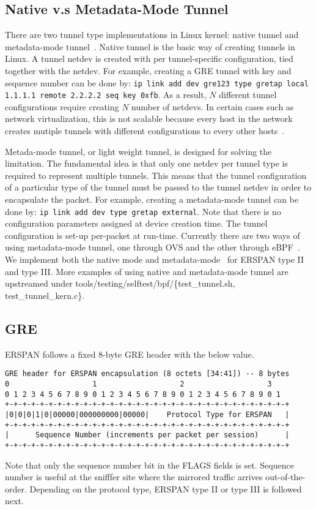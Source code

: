 \documentclass{sigplanconf}
\begin{document}
\subsection{Native v.s Metadata-Mode Tunnel}
There are two tunnel type implementations in Linux kernel:
native tunnel and metadata-mode tunnel~\cite{lwtunnel}.
Native tunnel is the basic way of creating tunnels in Linux.
A tunnel netdev is created with per tunnel-specific configuration,
tied together with the netdev. For example, creating a GRE tunnel
with key and sequence number can be done by:
\texttt{ip link add dev gre123 type gretap local 1.1.1.1 remote 2.2.2.2 seq key 0xfb}.
As a result, $N$ different tunnel configurations require creating
$N$ number of netdevs.  In certain cases such as network virtualization,
this is not scalable because every host in the network creates
mutiple tunnels with different configurations to every other hosts~\cite{nvp}.

Metada-mode tunnel, or light weight tunnel, is designed for solving
the limitation.  The fundamental idea is that only one netdev per
tunnel type is required to represent multiple tunnels.
This means that the tunnel configuration of a particular type
of the tunnel must be passed to the tunnel netdev in order
to encapsulate the packet.  For example, creating a metadata-mode
tunnel can be done by:
\texttt{ip link add dev type gretap external}.
Note that there is no configuration parameters assigned at device creation
time. The tunnel configuration is set-up per-packet at run-time.
Currently there are two ways of using metadata-mode tunnel, one through
OVS and the other through eBPF~\cite{dborkman}.
We implement both the native mode and metadata-mode~\cite{erspanmd}
for ERSPAN type II and type III.
More examples of using native and metadata-mode tunnel are upstreamed
under tools/testing/selftest/bpf/\{test\_tunnel.sh, test\_tunnel\_kern.c\}.

\subsection{GRE}
ERSPAN follows a fixed 8-byte GRE header with the below value.
{\scriptsize
\begin{verbatim}
GRE header for ERSPAN encapsulation (8 octets [34:41]) -- 8 bytes
0                   1                   2                   3
0 1 2 3 4 5 6 7 8 9 0 1 2 3 4 5 6 7 8 9 0 1 2 3 4 5 6 7 8 9 0 1
+-+-+-+-+-+-+-+-+-+-+-+-+-+-+-+-+-+-+-+-+-+-+-+-+-+-+-+-+-+-+-+-+
|0|0|0|1|0|00000|000000000|00000|    Protocol Type for ERSPAN   |
+-+-+-+-+-+-+-+-+-+-+-+-+-+-+-+-+-+-+-+-+-+-+-+-+-+-+-+-+-+-+-+-+
|      Sequence Number (increments per packet per session)      |
+-+-+-+-+-+-+-+-+-+-+-+-+-+-+-+-+-+-+-+-+-+-+-+-+-+-+-+-+-+-+-+-+
\end{verbatim}
}
Note that only the sequence number bit in the FLAGS fields is set.
Sequence number is useful at the snifffer site where the mirrored
traffic arrives out-of-the-order.  Depending on the protocol type,
ERSPAN type II or type III is followed next.
\end{document}
